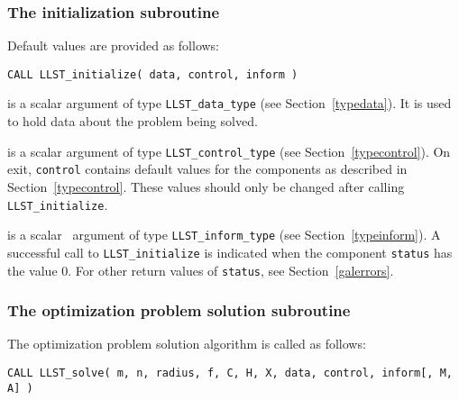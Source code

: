 \documentclass{galahad}
\newcommand{\packagename}{LLST}
\begin{document}

\subsubsection{The initialization subroutine}\label{subinit}
 Default values are provided as follows:

\hskip0.5in 
{\tt CALL \packagename\_initialize( data, control, inform )}

\begin{description}

 is a scalar \intentinout argument of type 
{\tt \packagename\_data\_type}
(see Section~\ref{typedata}). It is used to hold data about the problem being 
solved. 

 is a scalar \intentout argument of type 
{\tt \packagename\_control\_type}
(see Section~\ref{typecontrol}). 
On exit, {\tt control} contains default values for the components as
described in Section~\ref{typecontrol}.
These values should only be changed after calling 
{\tt \packagename\_initialize}.

 is a scalar \intentout\ argument of type 
{\tt \packagename\_inform\_type}
(see Section~\ref{typeinform}). A successful call to
{\tt \packagename\_initialize}
is indicated when the  component {\tt status} has the value 0. 
For other return values of {\tt status}, see Section~\ref{galerrors}.

\end{description}


\subsubsection{The optimization problem solution subroutine}
The optimization problem solution algorithm is called as follows:

\hskip0.5in 
{\tt CALL \packagename\_solve( m, n, radius, f, C, H, X, data, control, inform[, M, A] )}
\end{document}

